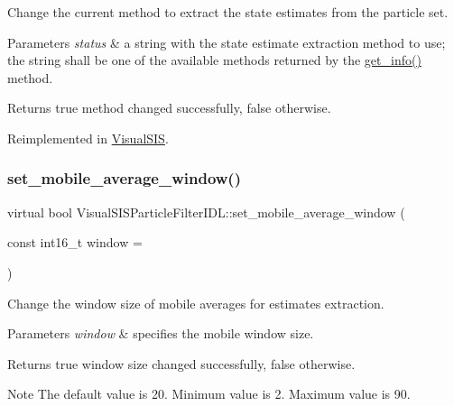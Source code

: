 Change the current method to extract the state estimates from the particle set. 


\begin{DoxyParams}{Parameters}
{\em status} & a string with the state estimate extraction method to use; the string shall be one of the available methods returned by the \hyperlink{classVisualSISParticleFilterIDL_a0721bc76b2d5848908a39e3a9c9740c0}{get\+\_\+info()} method. \\
\hline
\end{DoxyParams}
\begin{DoxyReturn}{Returns}
true method changed successfully, false otherwise. 
\end{DoxyReturn}


Reimplemented in \hyperlink{classVisualSIS_ab45998859ed6c115eb0a8446f94c764e}{Visual\+S\+IS}.

\mbox{\label{classVisualSISParticleFilterIDL_a40d91826291e2bae76f4545254307577}} 
\subsubsection{\texorpdfstring{set\+\_\+mobile\+\_\+average\+\_\+window()}{set\_mobile\_average\_window()}}
{\footnotesize\ttfamily virtual bool Visual\+S\+I\+S\+Particle\+Filter\+I\+D\+L\+::set\+\_\+mobile\+\_\+average\+\_\+window (\begin{DoxyParamCaption}\item[{const int16\+\_\+t}]{window = {} }\end{DoxyParamCaption})\hspace{0.3cm}{\ttfamily [virtual]}}



Change the window size of mobile averages for estimates extraction. 


\begin{DoxyParams}{Parameters}
{\em window} & specifies the mobile window size. \\
\hline
\end{DoxyParams}
\begin{DoxyReturn}{Returns}
true window size changed successfully, false otherwise. 
\end{DoxyReturn}
\begin{DoxyNote}{Note}
The default value is 20. Minimum value is 2. Maximum value is 90. 
\end{DoxyNote}



